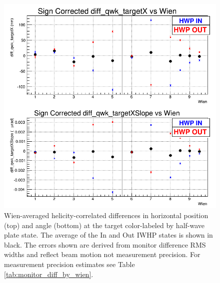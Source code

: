 \begin{figure}
\centering
\includegraphics[width=5.9in]{./Pictures/XDifferences_by_wien.png}
\caption{\label{fig:Xdiff_by_wien}Wien-averaged helicity-correlated differences in horizontal position (top) and angle (bottom) at the target color-labeled by half-wave plate state. The average of the In and Out IWHP states is shown in black. The errors shown are derived from monitor difference RMS widths and reflect beam motion not measurement precision. For measurement precision estimates see Table \ref{tab:monitor_diff_by_wien}.}
\end{figure}

